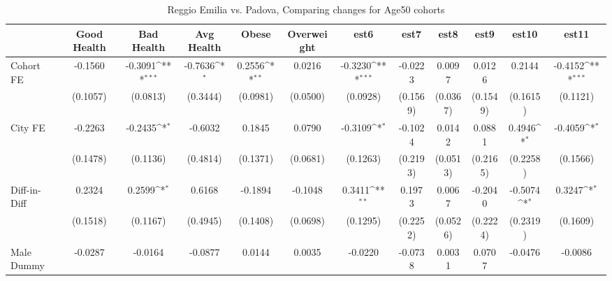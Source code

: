 \begin{table}[htbp]\centering
\def\sym#1{\ifmmode^{#1}\else\(^{#1}\)\fi}
\caption{Reggio Emilia vs. Padova, Comparing changes for Age50 cohorts}
\begin{tabular}{l*{11}{c}}
\toprule
            &\multicolumn{1}{c}{Good Health}&\multicolumn{1}{c}{Bad Health}&\multicolumn{1}{c}{Avg Health}&\multicolumn{1}{c}{Obese}&\multicolumn{1}{c}{Overweight}&\multicolumn{1}{c}{est6}&\multicolumn{1}{c}{est7}&\multicolumn{1}{c}{est8}&\multicolumn{1}{c}{est9}&\multicolumn{1}{c}{est10}&\multicolumn{1}{c}{est11}\\
\midrule
Cohort FE   &     -0.1560         &     -0.3091\sym{***}&     -0.7636\sym{*}  &      0.2556\sym{**} &      0.0216         &     -0.3230\sym{***}&     -0.0223         &      0.0097         &      0.0126         &      0.2144         &     -0.4152\sym{***}\\
            &    (0.1057)         &    (0.0813)         &    (0.3444)         &    (0.0981)         &    (0.0500)         &    (0.0928)         &    (0.1569)         &    (0.0367)         &    (0.1549)         &    (0.1615)         &    (0.1121)         \\
\addlinespace
City FE     &     -0.2263         &     -0.2435\sym{*}  &     -0.6032         &      0.1845         &      0.0790         &     -0.3109\sym{*}  &     -0.1024         &      0.0142         &      0.0881         &      0.4946\sym{*}  &     -0.4059\sym{*}  \\
            &    (0.1478)         &    (0.1136)         &    (0.4814)         &    (0.1371)         &    (0.0681)         &    (0.1263)         &    (0.2193)         &    (0.0513)         &    (0.2165)         &    (0.2258)         &    (0.1566)         \\
\addlinespace
Diff-in-Diff&      0.2324         &      0.2599\sym{*}  &      0.6168         &     -0.1894         &     -0.1048         &      0.3411\sym{**} &      0.1973         &      0.0067         &     -0.2040         &     -0.5074\sym{*}  &      0.3247\sym{*}  \\
            &    (0.1518)         &    (0.1167)         &    (0.4945)         &    (0.1408)         &    (0.0698)         &    (0.1295)         &    (0.2252)         &    (0.0526)         &    (0.2224)         &    (0.2319)         &    (0.1609)         \\
\addlinespace
Male Dummy  &     -0.0287         &     -0.0164         &     -0.0877         &      0.0144         &      0.0035         &     -0.0220         &     -0.0738         &      0.0031         &      0.0707         &     -0.0476         &     -0.0086         \\

\end{tabular}
\end{table}
